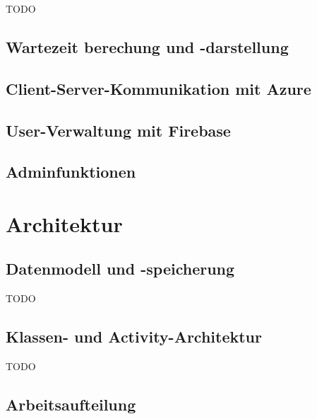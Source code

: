 TODO

\subsection{Wartezeit berechung und -darstellung}
\label{sec:implementierung:besonderheiten:wartezeit }

\subsection{Client-Server-Kommunikation mit Azure}
\label{sec:implementierung:besonderheiten:azure }


\subsection{User-Verwaltung mit Firebase}
\label{sec:implementierung:besonderheiten:firebase }


\subsection{Adminfunktionen}
\label{sec:implementierung:besonderheiten:admin }



\section{Architektur}
\label{sec:implementierung:architektur}

\subsection{Datenmodell und -speicherung}
\label{sec:implementierung:architektur:datenmodell }

TODO

\subsection{Klassen- und Activity-Architektur}
\label{sec:implementierung:architektur:klassenmodell }

TODO

\subsection{Arbeitsaufteilung}
\label{sec:implementierung:architektur:arbeitsaufteilung }

